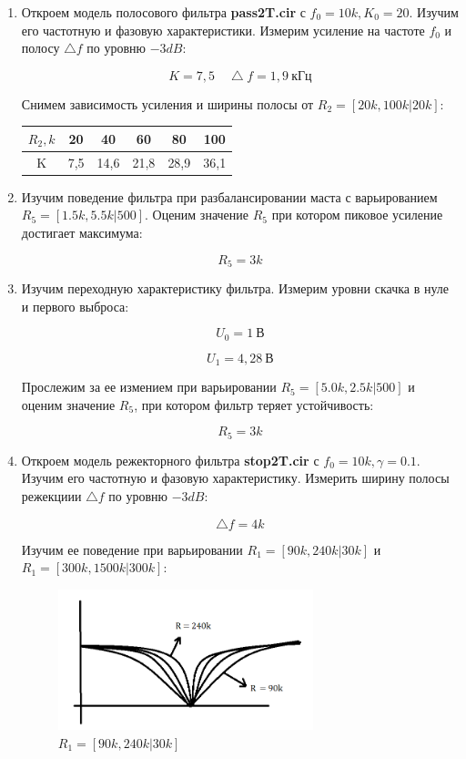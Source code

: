 \documentclass[a4paper, 12pt]{article}%
\begin{document}
\begin{enumerate}

\item Откроем модель полосового фильтра \textbf{pass2T.cir} с $f_0 = 10k, K_0 = 20$. Изучим его частотную и фазовую характеристики. Измерим усиление на частоте $f_0$ и полосу $\bigtriangleup f$ по уровню $-3dB$:

\[K = 7,5 \quad \bigtriangleup f = 1,9 \: \text{кГц}\]

Снимем зависимость усиления и ширины полосы от $R_2 = [20k, 100k|20k]$:

\begin{center}
\begin{tabular}{|c|c|c|c|c|c|}
\hline 
$R_2, k$ & 20 & 40 & 60 & 80 & 100 \\ 
\hline 
K & 7,5 & 14,6 & 21,8 & 28,9 & 36,1 \\ 
\hline 
\end{tabular} 
\end{center}

\item Изучим поведение фильтра при разбалансировании маста с варьированием $R_5 = [1.5k, 5.5k|500]$. Оценим значение $R_5$ при котором пиковое усиление достигает максимума:

\[R_5 = 3k\]

\item Изучим переходную характеристику фильтра. Измерим уровни скачка в нуле и первого выброса:

\[U_0 = 1 \: \text{В}\]

\[U_1 = 4,28 \: \text{В}\]

Прослежим за ее измением при варьировании $R_5 = [5.0k, 2.5k|500]$ и оценим значение $R_5$, при котором фильтр теряет устойчивость:

\[R_5 = 3k\]

\item Откроем модель режекторного фильтра \textbf{stop2T.cir} с $f_0 = 10k, \gamma = 0.1$. Изучим его частотную и фазовую характеристику. Измерить ширину полосы режекциии $\bigtriangleup f$ по уровню $-3 dB$:

\[\bigtriangleup f = 4 k\]

Изучим ее поведение при варьировании $R_1 = [90k, 240k|30k]$ и $R_1 = [300k, 1500k|300k]$:

\begin{figure}[h!]
\centering	
\includegraphics[width=0.7\textwidth]{images/2_4-1.png}
\caption{$R_1 = [90k, 240k|30k]$}
\label{2_4-1}
\end{figure}


\end{enumerate}
\end{document}
